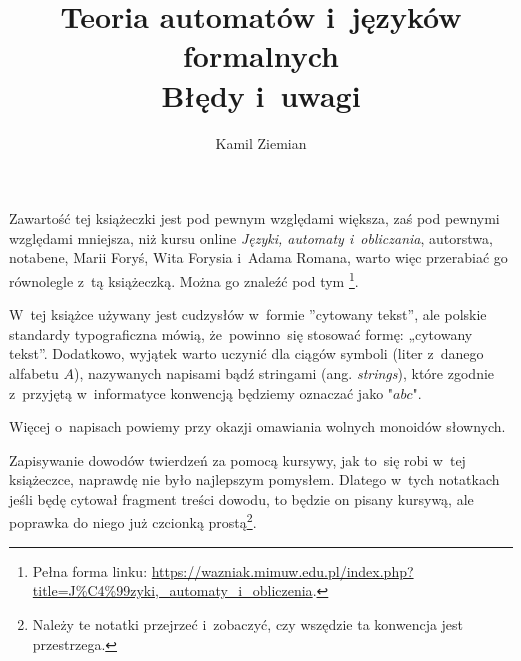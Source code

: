 \documentclass[a4paper,11pt]{article}
\title{Teoria automatów i~języków formalnych \\
  Błędy i~uwagi}
\author{Kamil Ziemian}
\begin{document}





\maketitle %









\start Zawartość tej książeczki jest pod pewnym względami większa, zaś
pod pewnymi względami mniejsza, niż kursu online \textit{Języki,
  automaty i~obliczania}, autorstwa, notabene, Marii Foryś, Wita
Forysia i~Adama Romana, warto więc przerabiać go równolegle z~tą
książeczką. Można go znaleźć pod tym
\footnote{Pełna forma linku:
  \href{https://wazniak.mimuw.edu.pl/index.php?title=J\%C4\%99zyki,\_automaty\_i\_obliczenia}
  {https://wazniak.mimuw.edu.pl/index.php?title=J\%C4\%99zyki,\_automaty\_i\_obliczenia}.}.

\vspace{\spaceFour}





\start W~tej książce używany jest cudzysłów w~formie ”cytowany tekst”,
ale polskie standardy typograficzna mówią, że~powinno~się stosować
formę: „cytowany tekst”. Dodatkowo, wyjątek warto uczynić dla ciągów
symboli (liter z~danego alfabetu $A$), nazywanych napisami bądź
stringami (ang. \textit{strings}), które zgodnie z~przyjętą
w~informatyce konwencją będziemy oznaczać jako $\texttt{"} abc \texttt{"}$.

Więcej o~napisach powiemy przy okazji omawiania wolnych monoidów słownych.

\vspace{\spaceFour}





\start Zapisywanie dowodów twierdzeń za pomocą kursywy, jak to~się robi
w~tej książeczce, naprawdę nie było najlepszym pomysłem. Dlatego w~tych
notatkach jeśli będę cytował fragment treści dowodu, to będzie on pisany
kursywą, ale poprawka do niego już czcionką prostą\footnote{Należy te
  notatki przejrzeć i~zobaczyć, czy wszędzie ta konwencja jest
  przestrzega.}.
\end{document}
